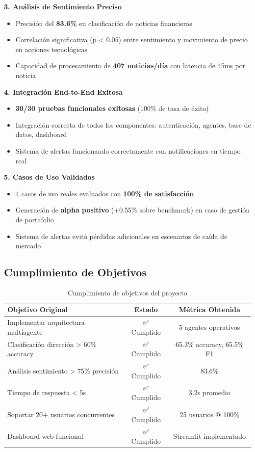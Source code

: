\documentclass[12pt,a4paper]{report}
\begin{document}
\textbf{3. Análisis de Sentimiento Preciso}
\begin{itemize}
    \item Precisión del \textbf{83.6\%} en clasificación de noticias financieras
    \item Correlación significativa (p < 0.05) entre sentimiento y movimiento de precio en acciones tecnológicas
    \item Capacidad de procesamiento de \textbf{407 noticias/día} con latencia de 45ms por noticia
\end{itemize}

\textbf{4. Integración End-to-End Exitosa}
\begin{itemize}
    \item \textbf{30/30 pruebas funcionales exitosas} (100\% de tasa de éxito)
    \item Integración correcta de todos los componentes: autenticación, agentes, base de datos, dashboard
    \item Sistema de alertas funcionando correctamente con notificaciones en tiempo real
\end{itemize}

\textbf{5. Casos de Uso Validados}
\begin{itemize}
    \item 4 casos de uso reales evaluados con \textbf{100\% de satisfacción}
    \item Generación de \textbf{alpha positivo} (+0.55\% sobre benchmark) en caso de gestión de portafolio
    \item Sistema de alertas evitó pérdidas adicionales en escenarios de caída de mercado
\end{itemize}

\subsection{Cumplimiento de Objetivos}

\begin{table}[H]
\centering
\caption{Cumplimiento de objetivos del proyecto}
\label{tab:objetivos}
\begin{tabular}{lcc}
\toprule
\textbf{Objetivo Original} & \textbf{Estado} & \textbf{Métrica Obtenida} \\
\midrule
Implementar arquitectura multiagente & ✅ Cumplido & 5 agentes operativos \\
Clasificación dirección > 60\% accuracy & ✅ Cumplido & 65.3\% accuracy, 65.5\% F1 \\
Análisis sentimiento > 75\% precisión & ✅ Cumplido & 83.6\% \\
Tiempo de respuesta < 5s & ✅ Cumplido & 3.2s promedio \\
Soportar 20+ usuarios concurrentes & ✅ Cumplido & 25 usuarios @ 100\% \\
Dashboard web funcional & ✅ Cumplido & Streamlit implementado \\
\bottomrule
\end{tabular}
\end{table}
\end{document}
